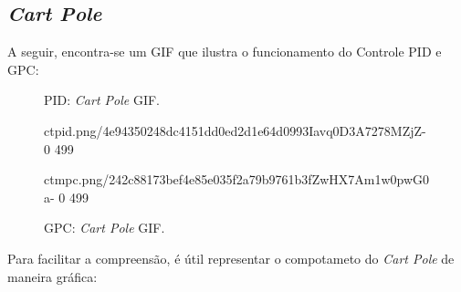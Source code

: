 \documentclass[12pt,           %
a4paper,                       %
openany,                       %
oneside,                       %
chapter=TITLE,                 %
english,                       %
spanish,                       %
brazil,                        %
sumario=tradicional]{abntex2}  %
\begin{document}
\begin{OnehalfSpace}
\subsection{\textit{Cart Pole}}

A seguir, encontra-se um GIF que ilustra o funcionamento do Controle PID e GPC:

\begin{figure}[H]
  \begin{minipage}{0.5\textwidth}
    \centering
    \caption{PID: \textit{Cart Pole} GIF.}
    {ctpid.png/4e94350248dc4151dd0ed2d1e64d0993Iavq0D3A7278MZjZ-}%
    {0}%
    {499}%
    \label{fig:GPC1}
  \end{minipage}
  \begin{minipage}{0.5\textwidth}
    \centering
    \caption{GPC: \textit{Cart Pole} GIF.}
    {ctmpc.png/242c88173bef4e85e035f2a79b9761b3fZwHX7Am1w0pwG0a-}%
    {0}%
    {499}%
    \label{fig:PID1}
  \end{minipage}
\end{figure}
\vspace*{-.7cm}
{\raggedright {}}

Para facilitar a compreensão, é útil representar o compotameto do \textit{Cart Pole} de maneira gráfica:


\end{OnehalfSpace}
\end{document}
